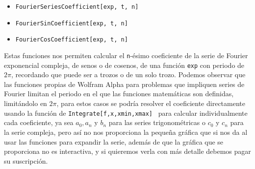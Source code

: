 \begin{itemize}
	\item \texttt{FourierSeriesCoefficient[exp, t, n]}
	\item \texttt{FourierSinCoefficient[exp, t, n]}
	\item \texttt{FourierCosCoefficient[exp, t, n]}
\end{itemize} 
Estas funciones nos permiten calcular el \texttt{n}-ésimo coeficiente de la serie de Fourier exponencial compleja, de senos o de cosenos, de una función \texttt{exp} con periodo de $2\pi$, recordando que puede ser a trozos o de un solo trozo. \newline
Podemos observar que las funciones propias de Wolfram Alpha para problemas que impliquen series de Fourier limitan el periodo en el que las funciones matemáticas son definidas, limitándolo en $2\pi$, para estos casos se podría resolver el coeficiente directamente usando la función de \texttt{Integrate[f,{x,xmin,xmax}]}~\cite{wolframMatemathicaPiecewise} para calcular individualmente cada coeficiente, ya sea $a_0, a_n$ y $b_n$ para las series trigonométricas o $c_0$ y $c_n$ para la serie compleja, pero así no nos proporciona la pequeña gráfica que si nos da al usar las funciones para expandir la serie, además de que la gráfica que se proporciona no es interactiva, y si quieremos verla con más detalle debemos pagar su suscripción.

